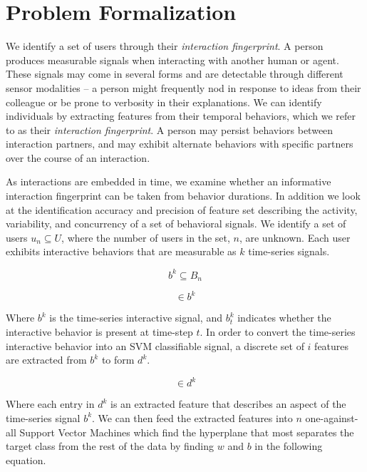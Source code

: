\documentclass[conference]{IEEEtran}
\begin{document}
\section{Problem Formalization}

We identify a set of users through their \textit{interaction fingerprint}. A person produces measurable signals when interacting with another human or agent. These signals may come in several forms and are detectable through different sensor modalities -- a person might frequently nod in response to ideas from their colleague or be prone to verbosity in their explanations. We can identify individuals by extracting features from their temporal behaviors, which we refer to as their \textit{interaction fingerprint}. A person may persist behaviors between interaction partners, and may exhibit alternate behaviors with specific partners over the course of an interaction. 

As interactions are embedded in time, we examine whether an informative interaction fingerprint can be taken from behavior durations. In addition we look at the identification accuracy and precision of feature set describing the activity, variability, and concurrency of a set of behavioral signals. We identify a set of users $u_n \subseteq U$, where the number of users in the set, $n$, are unknown. Each user exhibits interactive behaviors that are measurable as $k$ time-series signals.

\begin{equation}
    b^k \subseteq B_n
\end{equation}

\begin{equation}
    [b^k_{t=0} ... b^k_{t=n}] \in b^k
\end{equation}

Where $b^k$ is the time-series interactive signal, and $b^k_t$ indicates whether the interactive behavior is present at time-step $t$. In order to convert the time-series interactive behavior into an SVM classifiable signal, a discrete set of $i$ features are extracted from $b^k$ to form $d^k$.

\begin{equation}
    [d^k_0 ... d^k_i] \in d^k
\end{equation}

Where each entry in $d^k$ is an extracted feature that describes an aspect of the time-series signal $b^k$. We can then feed the extracted features into $n$ one-against-all Support Vector Machines which find the hyperplane that most separates the target class from the rest of the data by finding $w$ and $b$ in the following equation. \cite{abe_analysis_2003}
\end{document}
